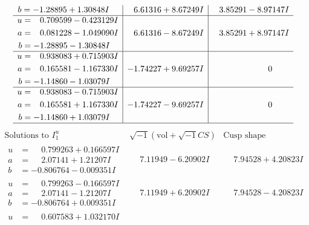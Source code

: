 \documentclass[1p]{elsarticle_modified}
\theoremstyle{definition}
\newcommand{\I}{\sqrt{-1}}
\begin{document}
$$\begin{array}{c|c|c}
\begin{aligned}
b &= -1.28895 + 1.30848 I\end{aligned}
 & \phantom{-}6.61316 + 8.67249 I & \phantom{-}3.85291 - 8.97147 I \\ \hline\begin{aligned}
u &= \phantom{-}0.709599 - 0.423129 I \\
a &= \phantom{-}0.081228 - 1.049090 I \\
b &= -1.28895 - 1.30848 I\end{aligned}
 & \phantom{-}6.61316 - 8.67249 I & \phantom{-}3.85291 + 8.97147 I \\ \hline\begin{aligned}
u &= \phantom{-}0.938083 + 0.715903 I \\
a &= \phantom{-}0.165581 - 1.167330 I \\
b &= -1.14860 - 1.03079 I\end{aligned}
 & -1.74227 + 9.69257 I & \phantom{-0.000000 } 0 \\ \hline\begin{aligned}
u &= \phantom{-}0.938083 - 0.715903 I \\
a &= \phantom{-}0.165581 + 1.167330 I \\
b &= -1.14860 + 1.03079 I\end{aligned}
 & -1.74227 - 9.69257 I & \phantom{-0.000000 } 0\\
 \hline 
 \end{array}$$\newpage$$\begin{array}{c|c|c}  
\text{Solutions to }I^u_{1}& \I (\text{vol} + \sqrt{-1}CS) & \text{Cusp shape}\\
 \hline 
\begin{aligned}
u &= \phantom{-}0.799263 + 0.166597 I \\
a &= \phantom{-}2.07141 + 1.21207 I \\
b &= -0.806764 - 0.009351 I\end{aligned}
 & \phantom{-}7.11949 - 6.20902 I & \phantom{-}7.94528 + 4.20823 I \\ \hline\begin{aligned}
u &= \phantom{-}0.799263 - 0.166597 I \\
a &= \phantom{-}2.07141 - 1.21207 I \\
b &= -0.806764 + 0.009351 I\end{aligned}
 & \phantom{-}7.11949 + 6.20902 I & \phantom{-}7.94528 - 4.20823 I \\ \hline\begin{aligned}
u &= \phantom{-}0.607583 + 1.032170 I \\

\end{aligned}
\end{array}$$
\end{document}
